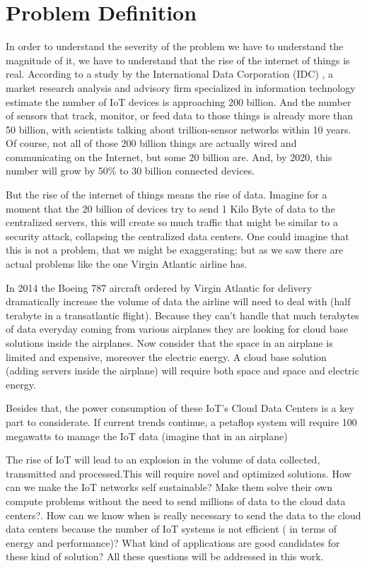 \section{Problem Definition}
\noindent

In order to understand the severity of the problem we have to understand the
magnitude of it, we have to understand that the rise of the internet of things
is real.  According to a study by the International Data Corporation (IDC)
\cite{IDC}, a market research analysis and advisory firm specialized in
information technology estimate the number of IoT devices is approaching  200
billion. And the number of sensors that track, monitor, or feed data to those
things is already more than 50 billion, with scientists talking about
trillion-sensor networks within 10 years. Of course, not all of those 200
billion things are actually wired and communicating on the Internet, but some
20 billion are. And, by 2020, this number will grow by 50\% to 30 billion
connected devices.\cite{EMC1}

But the rise of the internet of things means the rise of data. Imagine for a
moment that the 20 billion of devices try to send 1 Kilo Byte of data to the
centralized servers, this will create so much traffic that might be similar to
a security attack, collapsing the centralized data centers. One could imagine
that this is not a problem, that we might be exaggerating; but as we saw there
are actual problems like the one Virgin Atlantic airline has.

In 2014 the Boeing 787 aircraft ordered by Virgin Atlantic for delivery
dramatically increase the volume of data the airline will need to deal with
(half terabyte in a transatlantic flight). \cite{Finnegan} Because they can't
handle that much terabytes of data everyday coming from various airplanes they
are looking for cloud base solutions inside the airplanes. Now consider that
the space in an airplane is limited and expensive, moreover the electric
energy. A cloud base solution (adding servers inside the airplane) will require
both space and space and electric energy.

Besides that, the power consumption of these  IoT's Cloud Data Centers is a key
part to considerate. If current trends continue, a petaflop system will require 
100 megawatts to manage the IoT data \cite {Xizhou} (imagine that in an airplane)

The rise of IoT will lead to an explosion in the volume of data collected,
transmitted and processed.This will require novel and optimized solutions.  How
can we make the IoT networks self sustainable? Make them solve their own
compute problems without the need to send millions of data to the cloud data
centers?. How can we know when is really necessary to send the data to the cloud
data centers because the number of IoT systems is not efficient ( in terms of
energy and performance)? What kind of applications are good candidates for
these kind of solution? All these questions will be addressed in this work. 

